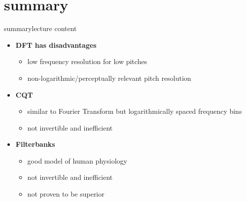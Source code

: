     \section{summary}
        \begin{frame}{summary}{lecture content}
            \begin{itemize}
                \item   \textbf{DFT has disadvantages}
                    \begin{itemize}
                        \item   low frequency resolution for low pitches
                        \item   non-logarithmic/perceptually relevant pitch resolution
                    \end{itemize}
                \bigskip
                \item      \textbf{CQT}
                    \begin{itemize}
                        \item   similar to Fourier Transform but logarithmically spaced frequency bins
                        \item   not invertible and inefficient
                    \end{itemize}
                \bigskip
                \item      \textbf{Filterbanks}
                    \begin{itemize}
                        \item   good model of human physiology
                        \item   not invertible and inefficient
                        \item   not proven to be superior
                    \end{itemize}
            \end{itemize}
        \end{frame}

